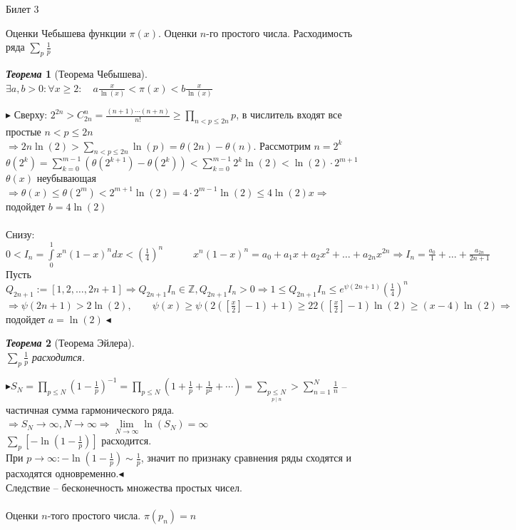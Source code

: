 \documentclass[a4paper,12pt]{article}
\newtheorem{teo}{\textit{Теорема}}
\newcommand{\TE}{\theta}
\newcommand{\SI}{\psi}
\newcommand{\q}{\quad}
\newcommand{\pb}{\blacktriangleright}
\newcommand{\pe}{\blacktriangleleft}
\newcommand{\Ra}{\Rightarrow}
\newcommand{\bb}[1]{\mathbb{#1}}
\newcommand{\SL}{\sum\limits}
\newcommand{\IL}{\int\limits}
\newcommand{\os}{\left(}
\newcommand{\cs}{\right)}
\begin{document}
\newpage
\begin{mybox}{\hypertarget{bil3}{Билет 3}}

\begin{formbox}{}
Оценки Чебышева функции $\pi(x)$. Оценки $n$-го простого числа. Расходимость ряда $\sum_p \frac{1}{p}$
\end{formbox}
\begin{formbox}{}
\begin{teo}[Теорема Чебышева]\q\\
$\exists a,b > 0: \forall x \ge 2:\q a\frac{x}{\ln(x)} <\pi(x) <b\frac{x}{\ln(x)} $
\end{teo}
\end{formbox}
$\pb$ Сверху: $2^{2n} > C_{2n}^n = \frac{(n+1)\cdots(n+n)}{n!}\ge \prod\limits_{n<p\le 2n} p $, в числитель входят все простые $n < p \le 2n$\\
$\Ra 2n\ln(2) > \SL_{n < p \le 2n}\ln(p) = \TE(2n) - \TE(n) $. Рассмотрим $n = 2^k$\\
$\TE(2^k) = \SL_{k=0}^{m-1} (\TE(2^{k+1}) - \TE(2^k)) < \SL_{k=0}^{m-1} 2^k\ln(2) < \ln(2)  \cdot 2^{m+1}  $\\
$\TE(x)$ неубывающая $\Ra \TE(x) \le \TE(2^m)< 2^{m+1} \ln(2) = 4 \cdot 2^{m-1}\ln(2) \le 4\ln(2)x\Ra  $ подойдет $b = 4\ln(2)$\\\q\\
Снизу:$0 < I_n = \IL_0^1 x^n(1-x)^n dx< \os \frac{1}{4} \cs^n\q\q\q x^n(1-x)^n = a_0 + a_1x + a_2x^2 +\dots +a_{2n}x^{2n}\Ra I_n = \frac{a_0}{1} + \dots + \frac{a_{2n}}{2n+1}  $\\
Пусть $Q_{2n+1} := [1,2,\dots, 2n+1]\Ra Q_{2n+1}I_n\in \bb{Z}  , Q_{2n+1}I_n > 0\Ra 1 \le  Q_{2n+1}I_n \le  e^{\SI(2n+1)}  \os \frac{1}{4} \cs^n    $\\
$\Ra  \SI(2n+1) >2\ln(2), \q\q \SI(x)\ge \SI(2(\left[\frac{x}{2}\right] - 1) + 1)\ge 2 2(\left[\frac{x}{2}\right] - 1)\ln(2) \ge (x-4)\ln(2)\Ra $ подойдет $a = \ln(2)\pe$

\begin{formbox}{}
\begin{teo}[Теорема Эйлера]\q\\$\sum_p \frac{1}{p}$ расходится.
\end{teo}
\end{formbox}
$\pb S_N = \prod\limits_{p \le N} (1 - \frac{1}{p})^{-1} = \prod\limits_{p \le N} \os 1 + \frac{1}{p} + \frac{1}{p^2} + \cdots\cs = \SL_{\underset{ p\mid n}{p \le N}} > \SL_{n=1}^N\frac{1}{n}$ -- частичная сумма гармонического ряда.\\
$\Ra S_N\to \infty, N\to\infty\Ra \lim\limits_{N\to\infty}\ln(S_N) = \infty$\\
$\SL_p[-\ln(1-\frac{1}{p})]$ расходится.\\
При $p\to\infty: -\ln(1-\frac{1}{p}) \sim \frac{1}{p}$, значит по признаку сравнения ряды сходятся и расходятся одновременно.$\pe$\\
Следствие -- бесконечность множества простых чисел.\\\q\\
Оценки $n$-того простого числа. $\pi(p_n) = n$
\end{mybox}
\end{document}
